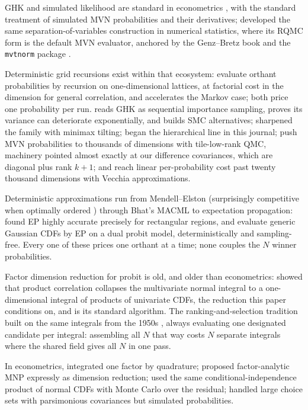 \documentclass[12pt]{article}
\theoremstyle{remark}
\begin{document}
GHK and simulated likelihood are standard in econometrics
\citep{geweke1994,hajivassiliou1998,train2009}, with
\citet{hmr1996} the standard treatment of simulated MVN probabilities
and their derivatives; \citet{genz1992}
developed the same separation-of-variables construction in numerical
statistics, where its RQMC form is the default MVN evaluator, anchored
by the Genz--Bretz book \citep{genzbretz2009} and the \texttt{mvtnorm}
package \citep{mi2009}.

Deterministic grid recursions exist within that ecosystem: \citet{miwa2003}
evaluate orthant probabilities by recursion on one-dimensional lattices,
at factorial cost in the dimension for general correlation, and
\citet{craig2008} accelerates the Markov case; both price one
probability per run. \citet{ridgway2016} reads GHK as sequential importance sampling, proves its
variance can deteriorate exponentially, and builds SMC alternatives; \citet{botev2017} sharpened the family with minimax tilting;
\citet{genton2018} began the hierarchical line in this journal;
\citet{cao2021} push MVN probabilities to thousands of
dimensions with tile-low-rank QMC, machinery pointed almost exactly at our
difference covariances, which are diagonal plus rank $k+1$; and
\citet{cao2025} reach linear per-probability cost past twenty thousand
dimensions with Vecchia approximations.

Deterministic approximations run from Mendell--Elston \citep{mendell1974}
(surprisingly competitive when optimally ordered \citep{connors2014})
through Bhat's MACML \citep{bhat2011} to expectation propagation:
\citet{cunningham2011} found EP
highly accurate precisely for rectangular regions, and \citet{fasano2025} evaluate generic Gaussian CDFs by EP on a dual probit
model, deterministically and sampling-free. Every one of these prices one
orthant at a time; none couples the $N$ winner probabilities.

Factor dimension reduction for probit is old, and older than
econometrics: \citet{curnow1962} showed that product correlation
collapses the multivariate normal integral to a one-dimensional integral
of products of univariate CDFs, the reduction this paper conditions on,
and \citet{dunnett1989} is its standard algorithm. The ranking-and-selection
tradition built on the same integrals from the 1950s
\citep{bechhofer1954,gupta1963}, always evaluating one designated
candidate per integral: assembling all $N$ that way costs $N$ separate
integrals where the shared field gives all $N$ in one pass.

In
econometrics, \citet{butler1982} integrated one factor by quadrature;
\citet{mcfadden1984} proposed factor-analytic MNP expressly as dimension
reduction; \citet{stern1992} used the same conditional-independence
product of normal CDFs with Monte Carlo over the residual;
\citet{bolduc1999} handled large choice sets with parsimonious
covariances but simulated probabilities.
\end{document}

